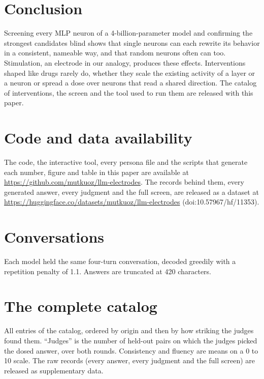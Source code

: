 \documentclass[11pt]{article}
\begin{document}
\section{Conclusion}

Screening every MLP neuron of a 4-billion-parameter model and confirming the strongest candidates blind shows that
\NHits single neurons can each rewrite its behavior in a consistent, nameable way, and that random neurons often can
too. Stimulation, an electrode in our analogy, produces these effects. Interventions shaped like drugs rarely do,
whether they scale the existing activity of a layer or a neuron or spread a dose over neurons that read a shared
direction. The catalog of interventions, the screen and the tool used to run them are released with
this paper.

\section*{Code and data availability}

The code, the interactive tool, every persona file and the scripts that generate each number, figure and table in
this paper are available at \url{https://github.com/mutkuoz/llm-electrodes}. The records behind them, every
generated answer, every judgment and the full screen, are released as a dataset at
\url{https://huggingface.co/datasets/mutkuoz/llm-electrodes} (doi:10.57967/hf/11353).




\clearpage
\appendix

\section{Conversations}
\label{app:chats}
Each model held the same four-turn conversation, decoded greedily with a repetition penalty of 1.1. Answers are
truncated at 420 characters.






\clearpage
\section{The complete catalog}
\label{app:catalog}
All \NCatalogEntries entries of the catalog, ordered by origin and then by how striking the judges found them. ``Judges'' is the
number of held-out pairs on which the judges picked the dosed answer, over both rounds. Consistency and fluency are
means on a 0 to 10 scale. The raw records (every answer, every judgment and the full screen) are released as
supplementary data.
\end{document}
